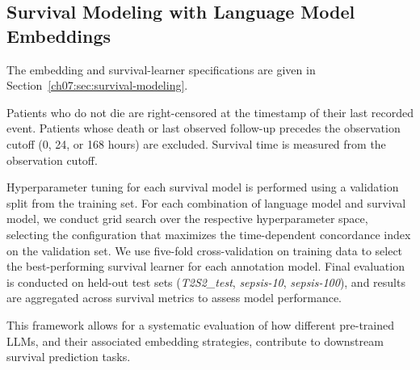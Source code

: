 \subsection{Survival Modeling with Language Model Embeddings}
\label{ch07:apd:encoder-survival}




The embedding and survival-learner specifications are given in Section~\ref{ch07:sec:survival-modeling}.

Patients who do not die are right-censored at the timestamp of their last recorded event.
Patients whose death or last observed follow-up precedes the observation cutoff (0, 24, or 168 hours) are excluded.
Survival time is measured from the observation cutoff.

Hyperparameter tuning for each survival model is performed using a validation split from the training set. 
For each combination of language model and survival model, we conduct grid search over the respective hyperparameter space, selecting the configuration that maximizes the time-dependent concordance index \citep{ch07:antolini2005time} on the validation set. 
We use five-fold cross-validation on training data to select the best-performing survival learner for each annotation model.
Final evaluation is conducted on held-out test sets (\textit{T2S2\_test}, \textit{sepsis-10}, \textit{sepsis-100}), and results are aggregated across survival metrics to assess model performance.

This framework allows for a systematic evaluation of how different pre-trained LLMs, and their associated embedding strategies, contribute to downstream survival prediction tasks.
\FloatBarrier
